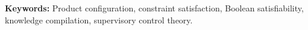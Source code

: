 \lipsum[1-3]

\vspace{0.1cm}
\textbf{Keywords:} Product configuration, constraint satisfaction, Boolean satisfiability, knowledge compilation, supervisory control theory.

